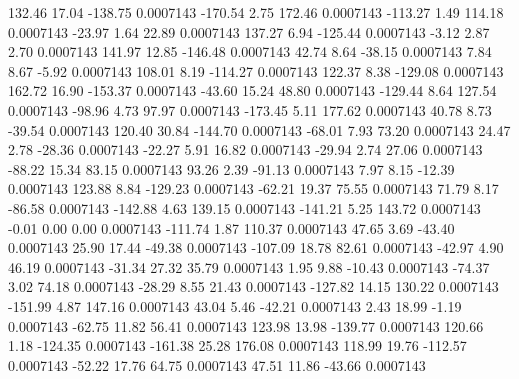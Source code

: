       132.46       17.04     -138.75     0.0007143
     -170.54        2.75      172.46     0.0007143
     -113.27        1.49      114.18     0.0007143
      -23.97        1.64       22.89     0.0007143
      137.27        6.94     -125.44     0.0007143
       -3.12        2.87        2.70     0.0007143
      141.97       12.85     -146.48     0.0007143
       42.74        8.64      -38.15     0.0007143
        7.84        8.67       -5.92     0.0007143
      108.01        8.19     -114.27     0.0007143
      122.37        8.38     -129.08     0.0007143
      162.72       16.90     -153.37     0.0007143
      -43.60       15.24       48.80     0.0007143
     -129.44        8.64      127.54     0.0007143
      -98.96        4.73       97.97     0.0007143
     -173.45        5.11      177.62     0.0007143
       40.78        8.73      -39.54     0.0007143
      120.40       30.84     -144.70     0.0007143
      -68.01        7.93       73.20     0.0007143
       24.47        2.78      -28.36     0.0007143
      -22.27        5.91       16.82     0.0007143
      -29.94        2.74       27.06     0.0007143
      -88.22       15.34       83.15     0.0007143
       93.26        2.39      -91.13     0.0007143
        7.97        8.15      -12.39     0.0007143
      123.88        8.84     -129.23     0.0007143
      -62.21       19.37       75.55     0.0007143
       71.79        8.17      -86.58     0.0007143
     -142.88        4.63      139.15     0.0007143
     -141.21        5.25      143.72     0.0007143
       -0.01        0.00        0.00     0.0007143
     -111.74        1.87      110.37     0.0007143
       47.65        3.69      -43.40     0.0007143
       25.90       17.44      -49.38     0.0007143
     -107.09       18.78       82.61     0.0007143
      -42.97        4.90       46.19     0.0007143
      -31.34       27.32       35.79     0.0007143
        1.95        9.88      -10.43     0.0007143
      -74.37        3.02       74.18     0.0007143
      -28.29        8.55       21.43     0.0007143
     -127.82       14.15      130.22     0.0007143
     -151.99        4.87      147.16     0.0007143
       43.04        5.46      -42.21     0.0007143
        2.43       18.99       -1.19     0.0007143
      -62.75       11.82       56.41     0.0007143
      123.98       13.98     -139.77     0.0007143
      120.66        1.18     -124.35     0.0007143
     -161.38       25.28      176.08     0.0007143
      118.99       19.76     -112.57     0.0007143
      -52.22       17.76       64.75     0.0007143
       47.51       11.86      -43.66     0.0007143
